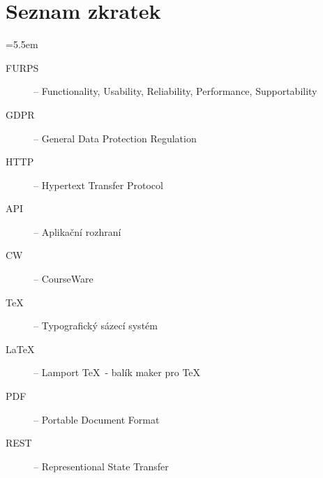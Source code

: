 \appendix

\chapter{Seznam zkratek}

\medskip
\bgroup \leftskip=5.5em

\begin{description}
	
	\item[FURPS] -- Functionality, Usability, Reliability, Performance, Supportability
	
	\item[GDPR] -- General Data Protection Regulation
	
	\item[HTTP] -- Hypertext Transfer Protocol
	
	\item[API] -- Aplikační rozhraní
	
	\item[CW] -- CourseWare
	
	\item[\TeX] -- Typografický sázecí systém
	
	\item[\LaTeX] -- Lamport \TeX\ - balík maker pro \TeX
	
	\item[PDF] -- Portable Document Format
	
	\item[REST] -- Representional State Transfer
	
	
	

\end{description}

\par\egroup